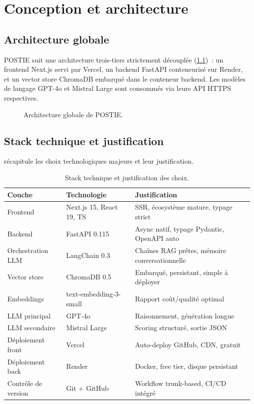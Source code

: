 \chapter{Conception et architecture}
\label{ch:archi}

\section{Architecture globale}
POSTIE suit une architecture trois-tiers strictement découplée
(\cref{fig:archi})~: un frontend Next.js servi par Vercel, un backend
FastAPI conteneurisé sur Render, et un vector store ChromaDB
embarqué dans le conteneur backend. Les modèles de langage GPT-4o
et Mistral Large sont consommés via leurs API HTTPS respectives.

\begin{figure}[H]\centering

\caption{Architecture globale de POSTIE.}
\label{fig:archi}
\end{figure}

\section{Stack technique et justification}
 récapitule les choix technologiques majeurs et leur
justification.

\begin{table}[H]\centering\small
\caption{Stack technique et justification des choix.}
\label{tab:stack}
\begin{tabularx}{\linewidth}{llX}
\toprule
\textbf{Couche}      & \textbf{Technologie}     & \textbf{Justification}\\
\midrule
Frontend             & Next.js 15, React 19, TS & SSR, écosystème mature, typage strict\\
Backend              & FastAPI 0.115            & Async natif, typage Pydantic, OpenAPI auto\\
Orchestration LLM    & LangChain 0.3            & Chaînes RAG prêtes, mémoire conversationnelle\\
Vector store         & ChromaDB 0.5             & Embarqué, persistant, simple à déployer\\
Embeddings           & text-embedding-3-small   & Rapport coût/qualité optimal\\
LLM principal        & GPT-4o                   & Raisonnement, génération longue\\
LLM secondaire       & Mistral Large            & Scoring structuré, sortie JSON\\
Déploiement front    & Vercel                   & Auto-deploy GitHub, CDN, gratuit\\
Déploiement back     & Render                   & Docker, free tier, disque persistant\\
Contrôle de version  & Git + GitHub             & Workflow trunk-based, CI/CD intégré\\
\bottomrule
\end{tabularx}
\end{table}

